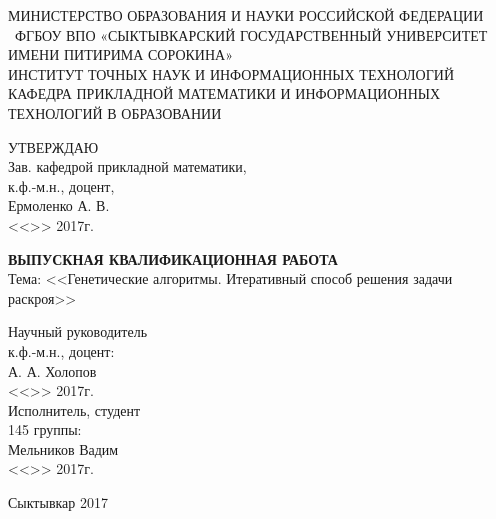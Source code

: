 \documentclass[14pt]{extarticle}
\begin{document}
\thispagestyle{empty}
	\begin{center}
		\small
		МИНИСТЕРСТВО ОБРАЗОВАНИЯ И НАУКИ РОССИЙСКОЙ ФЕДЕРАЦИИ\\~ФГБОУ ВПО «СЫКТЫВКАРСКИЙ ГОСУДАРСТВЕННЫЙ УНИВЕРСИТЕТ ИМЕНИ ПИТИРИМА СОРОКИНА»\\
		ИНСТИТУТ ТОЧНЫХ НАУК И ИНФОРМАЦИОННЫХ ТЕХНОЛОГИЙ\\
		КАФЕДРА ПРИКЛАДНОЙ МАТЕМАТИКИ И ИНФОРМАЦИОННЫХ ТЕХНОЛОГИЙ В ОБРАЗОВАНИИ\\
	\end{center}
	\vspace{0.5cm}
	\begin{flushright}
		УТВЕРЖДАЮ\\
		Зав. кафедрой прикладной математики,\\
		к.ф.-м.н., доцент,\\
		\underline{\phantom{aaaaaaaaaaaa}}Ермоленко А. В.\\
		<<\underline{\phantom{aaaa}}>>\underline{\phantom{aaaaaaaaaaaa}} 2017г.\\
	\end{flushright}
	\begin{center}		
		\vspace{2.5cm}
		\large \textbf{ВЫПУСКНАЯ КВАЛИФИКАЦИОННАЯ РАБОТА}\\
		Тема: <<Генетические алгоритмы. Итеративный способ решения задачи раскроя>>
	\end{center}
	\begin{flushright}
		\small Научный руководитель\\к.ф.-м.н., доцент:\\\underline{\phantom{aaaaaaaaaaa}}А. А. Холопов\\
		<<\underline{\phantom{aaaa}}>>\underline{\phantom{aaaaaaaaaaa}} 2017г.\\
		\vspace{0.5cm}
		Исполнитель, студент\\145 группы:\\\underline{\phantom{aaaaaaaaaaa}}Мельников Вадим\\<<\underline{\phantom{aaaa}}>>\underline{\phantom{aaaaaaaaaaa}} 2017г.\\
	\end{flushright}
	\vspace{3cm}
	\begin{center}
		Сыктывкар 2017
	\end{center}
	\newpage
	\tableofcontents
	\thispagestyle{empty}
	\newpage
\end{document}

